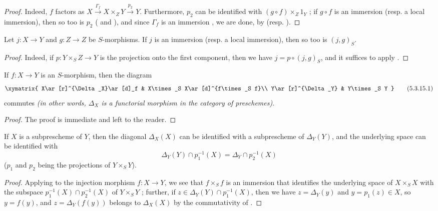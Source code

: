 \begin{proof}
Indeed, $f$ factors as $X\xrightarrow{\Gamma_f}X\times_Z Y\xrightarrow{p_2}Y$.
Furthermore, $p_2$ can be identified with $(g\circ f)\times_Z 1_Y$ ;
if $g\circ f$ is an immersion (resp. a local immersion), then so too is $p_2$ ( and ), and since $\Gamma_f$ is an immersion , we are done, by  (resp. ).
\end{proof}

\begin{corollary}[5.3.14]
\label{I.5.3.14}
Let $j:X\to Y$ and $g:Z\to Z$ be $S$-morphisms.
If $j$ is an immersion (resp. a local immersion), then so too is $(j,g)_S$.
\end{corollary}

\begin{proof}
Indeed, if $p:Y\times_S Z\to Y$ is the projection onto the first component, then we have $j=p\circ(j,g)_S$, and it suffices to apply .
\end{proof}

\begin{proposition}[5.3.15]
\label{I.5.3.15}
If $f:X\to Y$ is an $S$-morphism, then the diagram
\[
\label{I.5.3.15.1}
  \xymatrix{
    X\ar[r]^{\Delta_X}\ar[d]_f &
    X\times_S X\ar[d]^{f\times_S f}\\
    Y\ar[r]^{\Delta_Y} &
    Y\times_S Y
  }\tag{5.3.15.1}
\]
commutes \emph{(in other words, $\Delta_X$ is a functorial morphism in the category of preschemes)}.
\end{proposition}

\begin{proof}
The proof is immediate and left to the reader.
\end{proof}

\begin{corollary}[5.3.16]
\label{I.5.3.16}
If $X$ is a subprescheme of $Y$, then the diagonal $\Delta_X(X)$ can be identified with a subprescheme of $\Delta_Y(Y)$, and the underlying space can be identified with
\[
  \Delta_Y(Y)\cap p_1^{-1}(X)=\Delta_Y\cap p_2^{-1}(X)
\]
($p_1$ and $p_2$ being the projections of $Y\times_S Y$).
\end{corollary}

\begin{proof}
Applying  to the injection morphism $f:X\to Y$, we see that $f\times_S f$ is an immersion that identifies the underlying space of $X\times_S X$ with the subspace $p_1^{-1}(X)\cap p_2^{-1}(X)$ of $Y\times_S Y$ ;
further, if $z\in\Delta_Y(Y)\cap p_1^{-1}(X)$, then we have $z=\Delta_Y(y)$
and $y=p_1(z)\in X$, so $y=f(y)$, and $z=\Delta_Y(f(y))$ belongs to $\Delta_X(X)$ by the commutativity of .
\end{proof}

